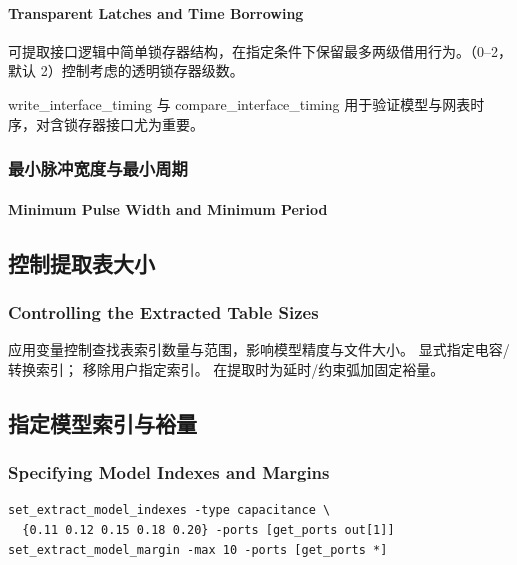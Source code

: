 \paragraph*{Transparent Latches and Time Borrowing}

 可提取接口逻辑中简单锁存器结构，在指定条件下保留最多两级借用行为。（0--2，默认 2）控制考虑的透明锁存器级数。

write_interface_timing 与 compare_interface_timing 用于验证模型与网表时序，对含锁存器接口尤为重要。

\subsubsection{最小脉冲宽度与最小周期}
\paragraph*{Minimum Pulse Width and Minimum Period}


\subsection{控制提取表大小}
\subsubsection*{Controlling the Extracted Table Sizes}

应用变量控制查找表索引数量与范围，影响模型精度与文件大小。 显式指定电容/转换索引； 移除用户指定索引。 在提取时为延时/约束弧加固定裕量。

\subsection{指定模型索引与裕量}
\subsubsection*{Specifying Model Indexes and Margins}

\begin{lstlisting}
set_extract_model_indexes -type capacitance \
  {0.11 0.12 0.15 0.18 0.20} -ports [get_ports out[1]]
set_extract_model_margin -max 10 -ports [get_ports *]
\end{lstlisting}

